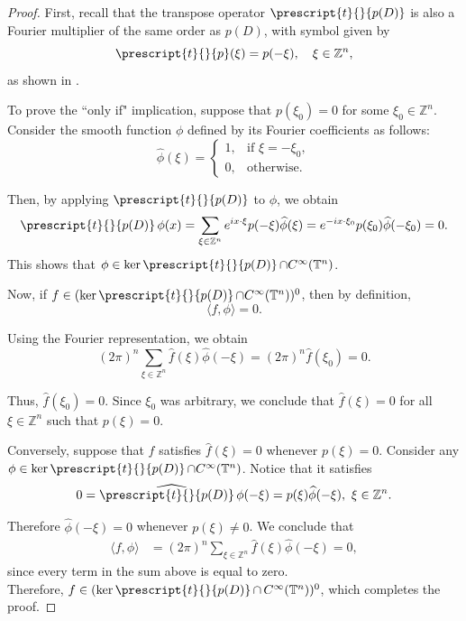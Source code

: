 \documentclass[11pt]{amsart}
\numberwithin{equation}{section}
\theoremstyle{definition}
\DeclareMathOperator{\pt}{\mathnormal{\prescript{t}{}{p(D)}}}
\begin{document}
	\begin{proof}
		First, recall that the transpose operator \( \pt \) is also a Fourier multiplier of the same order as \( p(D) \), with symbol given by  
		\[
		\prescript{t}{}{p}(\xi) = p(-\xi), \quad \xi \in \mathbb{Z}^n,
		\]
		as shown in \cite[Theorem 2.3]{FerraPetronilho2021}.
		
		To prove the ``only if" implication, suppose that \( p(\xi_0) = 0 \) for some \( \xi_0 \in \mathbb{Z}^n \). Consider the smooth function \( \phi \) defined by its Fourier coefficients as follows:
		\[
		\widehat{\phi}(\xi) =
		\begin{cases}
			1, & \text{if } \xi = -\xi_0, \\
			0, & \text{otherwise}.
		\end{cases}
		\]
		
		Then, by applying \( \pt \) to \( \phi \), we obtain  
		\[
		\pt \phi(x) = \sum_{\xi \in \mathbb{Z}^n} e^{i x \cdot \xi} p(-\xi) \widehat{\phi}(\xi) = e^{-i x \cdot \xi_0} p(\xi_0) \widehat{\phi}(-\xi_0) = 0.
		\]  
		This shows that \( \phi \in \ker \pt \cap C^\infty(\mathbb{T}^n) \).  
		
		Now, if \( f \in (\ker \pt \cap C^\infty(\mathbb{T}^n))^0 \), then by definition,
		\[
		\langle f, \phi \rangle = 0.
		\]
		
		Using the Fourier representation, we obtain  
		\[
		(2\pi)^{n} \sum_{\xi \in \mathbb{Z}^n} \widehat{f}(\xi) \widehat{\phi}(-\xi) = (2\pi)^{n} \widehat{f}(\xi_0) = 0.
		\]
		
		Thus, \( \widehat{f}(\xi_0) = 0 \). Since \( \xi_0 \) was arbitrary, we conclude that \( \widehat{f}(\xi) = 0 \) for all \( \xi \in \mathbb{Z}^n \) such that \( p(\xi) = 0 \).
		
		\medskip
		Conversely, suppose that \( f \) satisfies \( \widehat{f}(\xi) = 0 \) whenever \( p(\xi) = 0 \). Consider any \( \phi \in \ker \pt \cap C^\infty(\mathbb{T}^n) \). Notice that it satisfies 
		\[
		 0=\widehat{\pt \phi}(-\xi) = p(\xi) \widehat{\phi}(-\xi), \ \xi \in \mathbb{Z}^n.
		\]  
		
		Therefore \( \widehat{\phi}(-\xi) = 0 \) whenever \( p(\xi) \neq 0 \). We conclude that  
		\begin{align*}
			\langle f, \phi \rangle &= (2\pi)^n \sum_{\xi \in \mathbb{Z}^n} \widehat{f}(\xi) \widehat{\phi}(-\xi) = 0,
		\end{align*}
		since every term in the sum above is equal to zero.\\ \noindent Therefore, \( f \in (\ker \pt \cap\, C^\infty(\mathbb{T}^n))^0 \), which completes the proof.
	\end{proof}
	
\end{document}

